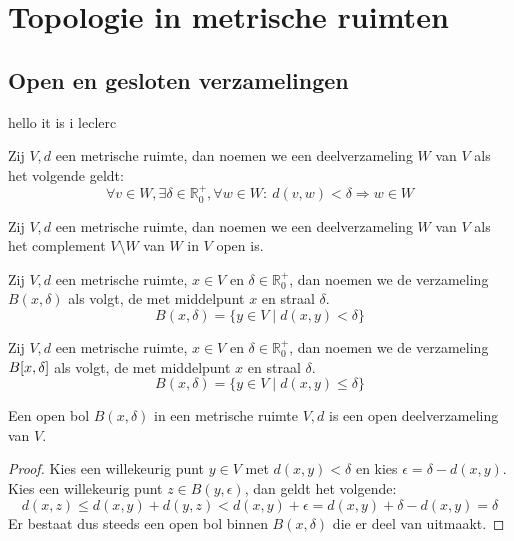 \documentclass[main.tex]{subfiles}
\begin{document}
\section{Topologie in metrische ruimten}
\label{sec:topol-metr-ruimt}

\subsection{Open en gesloten verzamelingen}
\label{sec:open-en-gesloten}
hello it is i leclerc
\begin{de}
  Zij $V,d$ een metrische ruimte, dan noemen we een deelverzameling $W$ van $V$  als het volgende geldt:
  \[ \forall v\in W, \exists \delta \in \mathbb{R}_{0}^{+}, \forall w\in W:\ d(v,w) < \delta \Rightarrow w \in W \]
\end{de}

\begin{de}
  Zij $V,d$ een metrische ruimte, dan noemen we een deelverzameling $W$ van $V$  als het complement $V\setminus W$ van $W$ in $V$ open is.
\end{de}

\begin{de}
  Zij $V,d$ een metrische ruimte, $x\in V$ en $\delta \in \mathbb{R}_{0}^{+}$, dan noemen we de verzameling $B(x,\delta)$ als volgt, de  met middelpunt $x$ en straal $\delta$.
  \[ B(x,\delta) = \{ y\in V \mid d(x,y) < \delta \} \]
\end{de}

\begin{de}
  Zij $V,d$ een metrische ruimte, $x\in V$ en $\delta \in \mathbb{R}_{0}^{+}$, dan noemen we de verzameling $B\interval{x}{\delta}$ als volgt, de  met middelpunt $x$ en straal $\delta$.
  \[ B(x,\delta) = \{ y\in V \mid d(x,y) \le \delta \} \]
\end{de}

\begin{st}
  Een open bol $B(x,\delta)$ in een metrische ruimte $V,d$ is een open deelverzameling van $V$.

  \begin{proof}
    Kies een willekeurig punt $y\in V$ met $d(x,y) < \delta$ en kies $\epsilon = \delta - d(x,y)$.
    Kies een willekeurig punt $z\in B(y,\epsilon)$, dan geldt het volgende:
    \[ d(x,z) \le d(x,y) + d(y,z) < d(x,y) + \epsilon = d(x,y) + \delta - d(x,y) = \delta \]
    Er bestaat dus steeds een open bol binnen $B(x,\delta)$ die er deel van uitmaakt.
  \end{proof}
\end{st}
\end{document}
